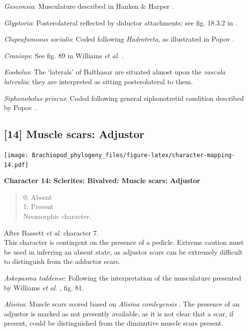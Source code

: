 \documentclass[]{book}
\theoremstyle{definition}
\theoremstyle{definition}
\theoremstyle{definition}
\theoremstyle{remark}
\begin{document}
\emph{Gasconsia}: Musculature described in Hanken \& Harper
\citeyearpar{Hanken1985Thetaxonomy}.

\emph{Glyptoria}: Posterolateral reflected by diductor attachments; see
fig. 18.3.2 in \citet{Bassett2001Functionalmorphology}.

\emph{Clupeafumosus socialis}: Coded following \emph{Hadrotreta}, as
illustrated in Popov \citeyearpar{Popov1992TheCambrian}.

\emph{Craniops}: See fig. 89 in Williams \emph{et al}.
\citeyearpar{Williams2000BrachiopodaLinguliformea}.

\emph{Eoobolus}: The `laterals' of Balthasar \citeyearpar[fig.
5]{Balthasar2009Thebrachiopod} are situated almost upon the
\emph{vascula} \emph{lateralia}; they are interpreted as sitting
posterolateral to them.

\emph{Siphonobolus priscus}: Coded following general siphonotretid
condition described by Popov \citeyearpar[p.~407]{Popov1992TheCambrian}.

\hypertarget{muscle-scars-adjustor}{%
\subsection*{{[}14{]} Muscle scars:
Adjustor}\label{muscle-scars-adjustor}}

\texttt{[image: Brachiopod\_phylogeny\_files/figure-latex/character-mapping-14.pdf]}

\textbf{Character 14: Sclerites: Bivalved: Muscle scars: Adjustor}

\begin{quote}
0: Absent\\
1: Present\\
Neomorphic character.
\end{quote}

After Bassett \emph{et al}.
\citeyearpar{Bassett2001Functionalmorphology} character 7.\\
This character is contingent on the presence of a pedicle. Extreme
caution must be used in inferring an absent state, as adjustor scars can
be extremely difficult to distinguish from the adductor scars.

\emph{Askepasma toddense}: Following the interpretation of the
musculature presented by Williams \emph{et al}.
\citeyearpar{Williams2000BrachiopodaLinguliformea}, fig. 81.

\emph{Alisina}: Muscle scars scored based on \emph{Alisina}
\emph{comleyensis} \citep{Bassett2001Functionalmorphology}. The presence
of an adjustor is marked as not presently available, as it is not clear
that a scar, if present, could be distinguished from the diminutive
muscle scars present.
\end{document}
